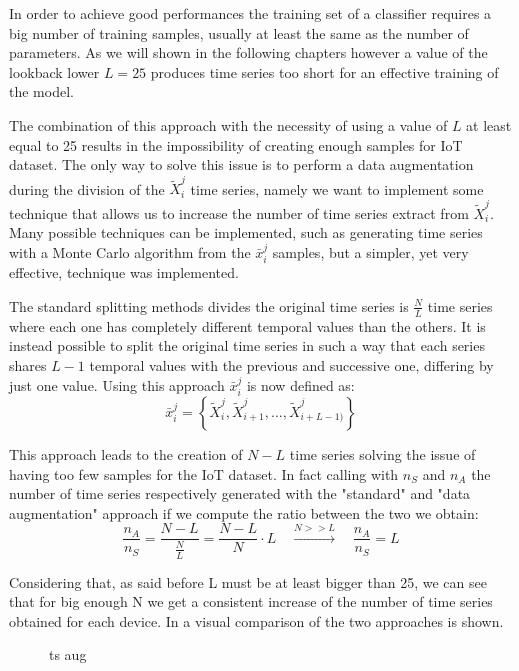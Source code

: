 In order to achieve good performances the training set of a classifier requires a big number of training samples, usually at least the same as the number of parameters. As we will shown in the following chapters however a value of the lookback lower $L=25$ produces time series too short for an effective training of the model. 

The combination of this approach with the necessity of using a value of $L$ at least equal to 25 results in the impossibility of creating enough samples for IoT dataset. The only way to solve this issue is to perform a data augmentation during the division of the ${\tilde{X}_i^j}$ time series, namely we want to implement some technique that allows us to increase the number of time series extract from ${\tilde{X}_i^j}$. Many possible techniques can be implemented, such as generating time series with a Monte Carlo algorithm from the $\bar{x}_i^j$ samples, but a simpler, yet very effective, technique was implemented.

The standard splitting methods divides the original time series is $\frac{N}{L}$ time series where each one has completely different temporal values than the others. It is instead possible to split the original time series in such a way that each series shares $L-1$ temporal values with the previous and successive one, differing by just one value. Using this approach $\bar{x}_i^j$
is now defined as:
\begin{equation}
    \bar{x}_i^j = \left\{\tilde{X}_{i}^j, \tilde{X}_{i +1 }^j, \dots, \tilde{X}_{i+L-1)}^j  \right\}
\end{equation}

This approach leads to the creation of $N-L$ time series solving the issue of having too few samples for the IoT dataset. In fact calling with $n_S$ and $n_A$ the number of time series respectively generated with the "standard" and "data augmentation" approach if we compute the ratio between the two we obtain:
\begin{equation}
    \frac{n_A}{n_S} = \frac{N-L}{\frac{N}{L}} = \frac{N-L}{N}\cdot L \quad \xrightarrow{N>>L}
    \quad \frac{n_A}{n_S}= L 
\end{equation}

Considering that, as said before L must be at least bigger than 25, we can see that for big enough N we get a consistent increase of the number of time series obtained for each device. In  a visual comparison of the two approaches is shown.

\begin{figure}
    \centering
\missingfigure{}
\caption{ts aug}
    \label{fig:ts_aug}
\end{figure}

